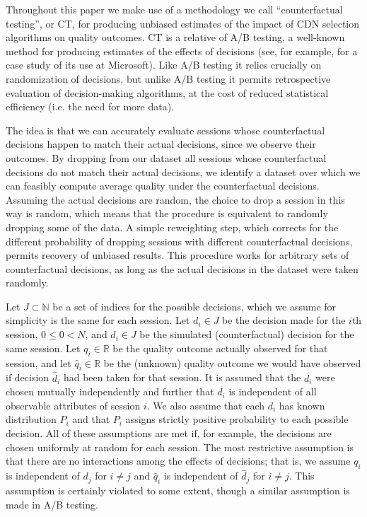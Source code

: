 Throughout this paper we make use of a methodology we call ``counterfactual testing'', or CT, for producing unbiased estimates of the impact of CDN selection algorithms on quality outcomes.  CT is a relative of A/B testing, a well-known method for producing estimates of the effects of decisions (see, for example, \cite{kohavi2009online} for a case study of its use at Microsoft).  Like A/B testing it relies crucially on randomization of decisions, but unlike A/B testing it permits retrospective evaluation of decision-making algorithms, at the cost of reduced statistical efficiency (i.e. the need for more data).  

The idea is that we can accurately evaluate sessions whose counterfactual decisions happen to match their actual decisions, since we observe their outcomes.  By dropping from our dataset all sessions whose counterfactual decisions do not match their actual decisions, we identify a dataset over which we can feasibly compute average quality under the counterfactual decisions.  Assuming the actual decisions are random, the choice to drop a session in this way is random, which means that the procedure is equivalent to randomly dropping some of the data.  A simple reweighting step, which corrects for the different probability of dropping sessions with different counterfactual decisions, permits recovery of unbiased results.  This procedure works for arbitrary sets of counterfactual decisions, as long as the actual decisions in the dataset were taken randomly.

Let $J \subset \mathbb{N}$ be a set of indices for the possible decisions, which we assume for simplicity is the same for each session.  Let $d_i \in J$ be the decision made for the $i$th session, $0 \leq 0 < N$, and $\hat{d}_i \in J$ be the simulated (counterfactual) decision for the same session.  Let $q_i \in \mathbb{R}$ be the quality outcome actually observed for that session, and let $\hat{q}_i \in \mathbb{R}$ be the (unknown) quality outcome we would have observed if decision $\hat{d}_i$ had been taken for that session.  It is assumed that the $d_i$ were chosen mutually independently and further that $d_i$ is independent of all observable attributes of session $i$.  We also assume that each $d_i$ has known distribution $P_i$ and that $P_i$ assigns strictly positive probability to each possible decision.  All of these assumptions are met if, for example, the decisions are chosen uniformly at random for each session.  The most restrictive assumption is that there are no interactions among the effects of decisions; that is, we assume $q_i$ is independent of $d_j$ for $i \neq j$ and $\hat{q}_i$ is independent of $\hat{d}_j$ for $i \neq j$.  This assumption is certainly violated to some extent, though a similar assumption is made in A/B testing.


